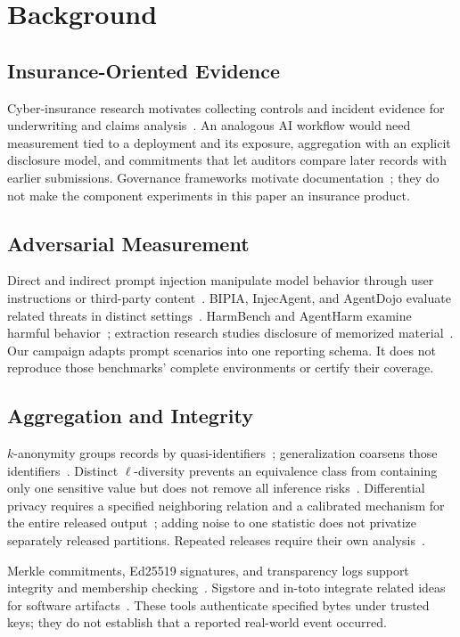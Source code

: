 \section{Background}
\label{sec:background}
\subsection{Insurance-Oriented Evidence}
Cyber-insurance research motivates collecting controls and incident evidence for underwriting and claims analysis~\cite{romanosky_2019_content,eling_2016_cyberrisk}. An analogous AI workflow would need measurement tied to a deployment and its exposure, aggregation with an explicit disclosure model, and commitments that let auditors compare later records with earlier submissions. Governance frameworks motivate documentation~\cite{nist_2023_ai_rmf,nist_2024_genai_profile}; they do not make the component experiments in this paper an insurance product.

\subsection{Adversarial Measurement}
Direct and indirect prompt injection manipulate model behavior through user instructions or third-party content~\cite{perez_2022_ignore,schulhoff_2023_hackaprompt,greshake_2023_not}. BIPIA, InjecAgent, and AgentDojo evaluate related threats in distinct settings~\cite{yi_2024_bipia,zhan_2024_injecagent,debenedetti_2024_agentdojo}. HarmBench and AgentHarm examine harmful behavior~\cite{mazeika_2024_harmbench,andriushchenko_2025_agentharm}; extraction research studies disclosure of memorized material~\cite{carlini_2021_extracting,nasr_2023_scalable_extraction}. Our campaign adapts prompt scenarios into one reporting schema. It does not reproduce those benchmarks' complete environments or certify their coverage.

\subsection{Aggregation and Integrity}
$k$-anonymity groups records by quasi-identifiers~\cite{sweeney_2002_kanon}; generalization coarsens those identifiers~\cite{lefevre_2006_mondrian}. Distinct $\ell$-diversity prevents an equivalence class from containing only one sensitive value but does not remove all inference risks~\cite{machanavajjhala_2007_ldiversity}. Differential privacy requires a specified neighboring relation and a calibrated mechanism for the entire released output~\cite{dwork_2014_dp}; adding noise to one statistic does not privatize separately released partitions. Repeated releases require their own analysis~\cite{ganta_2008_composition}.

Merkle commitments, Ed25519 signatures, and transparency logs support integrity and membership checking~\cite{merkle_1989_certified,bernstein_2012_ed25519,laurie_2013_rfc6962}. Sigstore and in-toto integrate related ideas for software artifacts~\cite{newman_2022_sigstore,torresarias_2019_intoto}. These tools authenticate specified bytes under trusted keys; they do not establish that a reported real-world event occurred.
